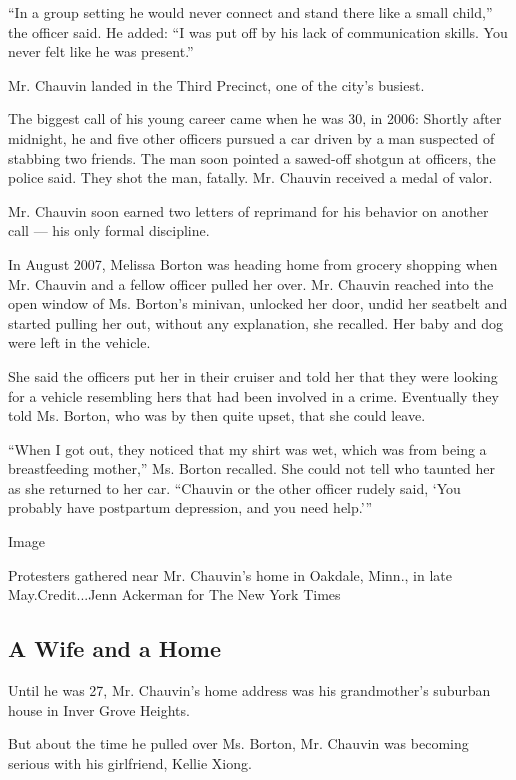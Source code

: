 ``In a group setting he would never connect and stand there like a small
child,'' the officer said. He added: ``I was put off by his lack of
communication skills. You never felt like he was present.''

Mr. Chauvin landed in the Third Precinct, one of the city's busiest.

The biggest call of his young career came when he was 30, in 2006:
Shortly after midnight, he and five other officers pursued a car driven
by a man suspected of stabbing two friends. The man soon pointed a
sawed-off shotgun at officers, the police said. They shot the man,
fatally. Mr. Chauvin received a medal of valor.

Mr. Chauvin soon earned two letters of reprimand for his behavior on
another call --- his only formal discipline.

In August 2007, Melissa Borton was heading home from grocery shopping
when Mr. Chauvin and a fellow officer pulled her over. Mr. Chauvin
reached into the open window of Ms. Borton's minivan, unlocked her door,
undid her seatbelt and started pulling her out, without any explanation,
she recalled. Her baby and dog were left in the vehicle.

She said the officers put her in their cruiser and told her that they
were looking for a vehicle resembling hers that had been involved in a
crime. Eventually they told Ms. Borton, who was by then quite upset,
that she could leave.

``When I got out, they noticed that my shirt was wet, which was from
being a breastfeeding mother,'' Ms. Borton recalled. She could not tell
who taunted her as she returned to her car. ``Chauvin or the other
officer rudely said, `You probably have postpartum depression, and you
need help.'''

Image

Protesters gathered near Mr. Chauvin's home in Oakdale, Minn., in late
May.Credit...Jenn Ackerman for The New York Times

\hypertarget{a-wife-and-a-home}{%
\subsection{A Wife and a Home}\label{a-wife-and-a-home}}

Until he was 27, Mr. Chauvin's home address was his grandmother's
suburban house in Inver Grove Heights.

But about the time he pulled over Ms. Borton, Mr. Chauvin was becoming
serious with his girlfriend, Kellie Xiong.

